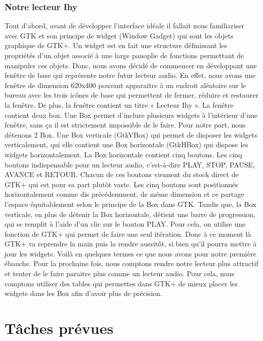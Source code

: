 \documentclass[a4paper,12pt]{article}
\begin{document}
		\subsubsection{Notre lecteur Ihy}
Tout d'abord, avant de développer l'interface idéale  il fallait nous
familiariser avec GTK et son principe de widget (Window Gadget) qui sont les
objets graphique de GTK+. Un widget est en fait une structure définissant les
propriétés d'un objet associé à une large panoplie de fonctions permettant de
manipuler ces objets. Donc, nous avons décidé de commencer en développant une
fenêtre de base qui représente notre futur lecteur audio. En effet, nous avons
une fenêtre de dimension 620x400 pouvant apparaitre à un endroit aléatoire sur
le bureau avec les trois icônes de base qui permettent de fermer, réduire et
restaurer la fenêtre. De plus, la fenêtre contient un titre « Lecteur Ihy ».  La
fenêtre contient deux box. Une Box permet d'inclure plusieurs widgets à
l'intérieur d'une fenêtre, sans ça il est strictement impossible de le faire.
Pour notre part, nous détenons 2 Box. Une Box verticale (GtkVBox) qui permet de
disposer les widgets verticalement, qui elle contient une Box horizontale
(GtkHBox) qui dispose les widgets horizontalement.  La Box horizontale contient
cinq boutons. Les cinq boutons indispensable pour un lecteur audio, c'est-à-dire
PLAY, STOP, PAUSE, AVANCE et RETOUR. Chacun de ces boutons viennent du stock
direct de GTK+ qui est pour sa part plutôt vaste. Les cinq boutons sont
positionnés horizontalement comme dis précédemment, de même dimension et ce
partage l'espace équitablement selon le principe de la Box dans GTK.  Tandis
que, la Box verticale, en plus de détenir la Box horizontale, détient une barre
de progression, qui se remplit à l'aide d'un clic sur le bouton PLAY. Pour
cela, on utilise une fonction de GTK+ qui permet de faire une seul itération.
Donc à ce moment là GTK+ va reprendre la main puis la rendre aussitôt, si bien
qu’il pourra mettre à jour les widgets.        Voilà en quelques termes ce que
nous avons pour notre première ébauche. Pour la prochaine fois, nous comptons
rendre notre lecteur plus attractif et tenter de le faire paraitre plus comme un
lecteur audio. Pour cela, nous comptons utiliser des tables qui permettes dans
GTK+ de mieux placer les widgets dans les Box afin d'avoir plus de précision. 

\section{Tâches prévues}
\end{document}

